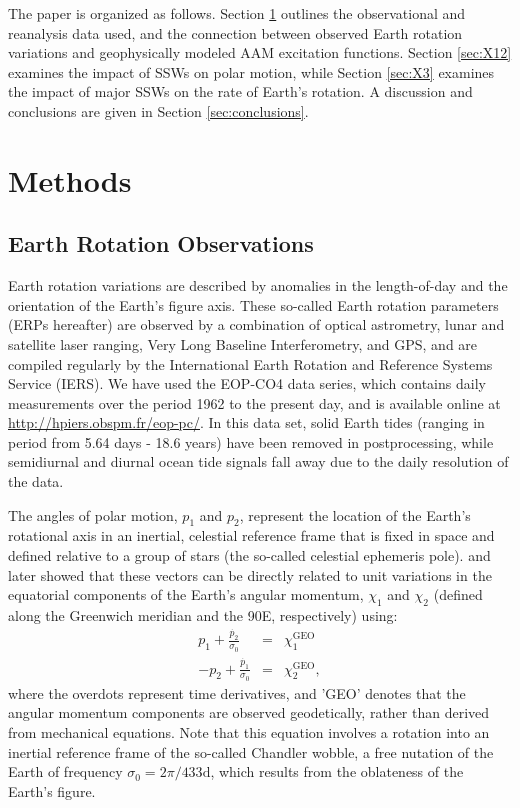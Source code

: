 \documentclass[draft,jgrga]{agutex}
\begin{document}
\begin{article}
The paper is organized as follows.
Section \ref{sec:method} outlines the observational and reanalysis data used, and the connection between observed Earth rotation variations and geophysically modeled AAM excitation functions.
Section \ref{sec:X12} examines the impact of SSWs on polar motion, while Section \ref{sec:X3}  examines the impact of major SSWs on the rate of Earth's rotation.
A discussion and conclusions are given in Section \ref{sec:conclusions}.


\section{Methods}
\label{sec:method}


\subsection{Earth Rotation Observations}
\label{sec:ERPobs}
 {Earth rotation variations are described by anomalies in the length-of-day and the orientation of the Earth's figure axis. 
These so-called Earth rotation parameters (ERPs hereafter) are observed by a combination of optical astrometry, lunar and satellite laser ranging, Very Long Baseline Interferometry, and GPS, and are compiled regularly by the International Earth Rotation and Reference Systems Service (IERS).}
We have used the EOP-CO4 data series, which contains daily measurements over the period 1962 to the present day, and is available online at \url{http://hpiers.obspm.fr/eop-pc/}.
In this data set, solid Earth tides (ranging in period from 5.64 days - 18.6 years) have been removed in postprocessing, while semidiurnal and diurnal ocean tide signals fall away due to the daily resolution of the data.

 {The angles of polar motion, $p_1$ and $p_2$, represent the location of the Earth's rotational axis in an inertial, celestial reference frame that is fixed in space and defined relative to a group of stars (the so-called celestial ephemeris pole).}
\citet{barnesetal1983} and later \citet{Gross1992}  { showed that these vectors can be directly related to unit variations in 
the equatorial components of the Earth's angular momentum, $\chi_1$ and $\chi_2$ (defined along the Greenwich meridian and the 90\degree E, respectively) using:}
\begin{eqnarray}
  p_1 + \frac{\dot{p_2}}{\sigma_0} &=& \chi_1^{\text{GEO}} \label{eq:PM1_to_AEF} \\
  -p_2 + \frac{\dot{p_1}}{\sigma_0} &=& \chi_2^{\text{GEO}}, \label{eq:PM2_to_AEF}
\end{eqnarray}
 {where the overdots represent time derivatives, and 'GEO' denotes that the angular momentum components are observed geodetically, rather than derived from mechanical equations.}
Note that this equation involves a rotation into an inertial reference frame 
of the so-called Chandler wobble, a free nutation of the Earth of frequency 
$\sigma_0 = 2\pi/ 433\text{d}$, which results from the oblateness of the Earth's figure.



\end{article}
\end{document}
